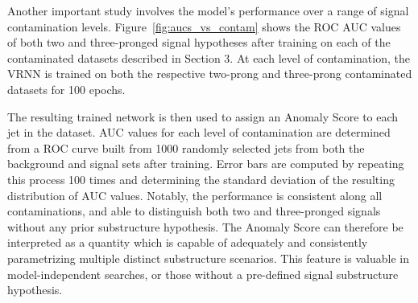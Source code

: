 \documentclass[12pt, a4paper]{article}
\begin{document}



Another important study involves the model's performance over a range of signal contamination
levels. Figure~\ref{fig:aucs_vs_contam} shows the ROC AUC values of both two and three-pronged signal hypotheses
after training on each of the contaminated datasets described in Section 3. 
At each level of contamination, the VRNN is trained on both the respective two-prong and three-prong contaminated datasets for 100 epochs. 

The resulting trained network is then used to assign an Anomaly Score to each jet in the dataset. 
AUC values for each level of contamination are determined from a ROC curve built from 1000 randomly selected jets from both the background and signal sets after training.
Error bars are computed by repeating this process 100 times and determining the standard deviation of the resulting distribution of AUC values.
Notably, the performance is consistent along all contaminations, and able to distinguish both two and three-pronged signals without any prior substructure hypothesis. 
The Anomaly Score can therefore be interpreted as a quantity which is capable of adequately and consistently parametrizing multiple distinct substructure scenarios. 
This feature is valuable in model-independent searches, or those without a pre-defined signal substructure hypothesis. 
\end{document}
